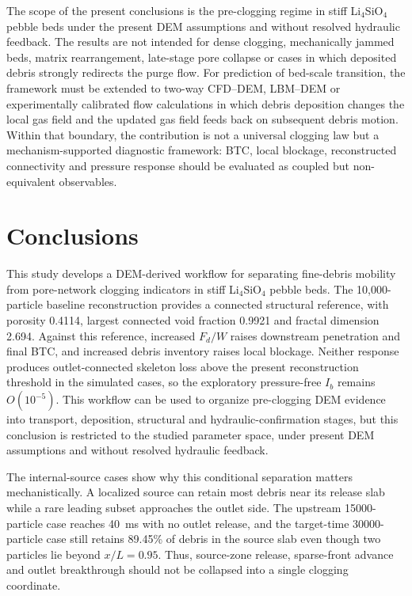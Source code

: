 \documentclass[preprint,12pt,authoryear]{elsarticle}
\newcommand{\LiSi}{Li$_4$SiO$_4$\xspace}
\newcommand{\FdW}{$F_d/W$\xspace}
\newcommand{\BTC}{BTC\xspace}
\newcommand{\Ib}{$I_b$\xspace}
\begin{document}
The scope of the present conclusions is the pre-clogging regime in stiff \LiSi pebble beds under the present DEM assumptions and without resolved hydraulic feedback. The results are not intended for dense clogging, mechanically jammed beds, matrix rearrangement, late-stage pore collapse or cases in which deposited debris strongly redirects the purge flow. For prediction of bed-scale transition, the framework must be extended to two-way CFD--DEM, LBM--DEM or experimentally calibrated flow calculations in which debris deposition changes the local gas field and the updated gas field feeds back on subsequent debris motion. Within that boundary, the contribution is not a universal clogging law but a mechanism-supported diagnostic framework: \BTC, local blockage, reconstructed connectivity and pressure response should be evaluated as coupled but non-equivalent observables.

\section{Conclusions}

This study develops a DEM-derived workflow for separating fine-debris mobility from pore-network clogging indicators in stiff \LiSi pebble beds. The 10,000-particle baseline reconstruction provides a connected structural reference, with porosity 0.4114, largest connected void fraction 0.9921 and fractal dimension 2.694. Against this reference, increased \FdW raises downstream penetration and final \BTC, and increased debris inventory raises local blockage. Neither response produces outlet-connected skeleton loss above the present reconstruction threshold in the simulated cases, so the exploratory pressure-free \Ib remains $O(10^{-5})$. This workflow can be used to organize pre-clogging DEM evidence into transport, deposition, structural and hydraulic-confirmation stages, but this conclusion is restricted to the studied parameter space, under present DEM assumptions and without resolved hydraulic feedback.

The internal-source cases show why this conditional separation matters mechanistically. A localized source can retain most debris near its release slab while a rare leading subset approaches the outlet side. The upstream 15000-particle case reaches \SI{40}{ms} with no outlet release, and the target-time 30000-particle case still retains 89.45\% of debris in the source slab even though two particles lie beyond $x/L=0.95$. Thus, source-zone release, sparse-front advance and outlet breakthrough should not be collapsed into a single clogging coordinate.
\end{document}
